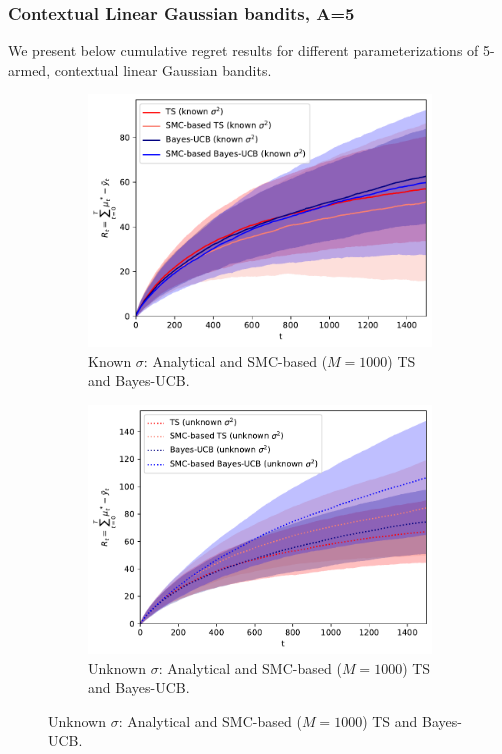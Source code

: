 \clearpage
\subsubsection{Contextual Linear Gaussian bandits, A=5}
\label{asssec:static_bandits_linearGaussian_5}

We present below cumulative regret results for different parameterizations of 5-armed, contextual linear Gaussian bandits.

\begin{figure}[!h]
	\centering
	\begin{subfigure}[b]{0.46\textwidth}
		\centering
		\includegraphics[width=\textwidth]{./fods_figs/static/linear_gaussian/A5/theta-0.2_-0.2_-0.1_-0.1_0._0._0.1_0.1_0.2_0.2_sigma0.5_0.5_0.5_0.5_0.5_M1000_cumulative_regret_knownsigma}
		\caption{Known $\sigma$: Analytical and SMC-based ($M=1000$) TS and Bayes-UCB.}
	\end{subfigure}
	\begin{subfigure}[b]{0.46\textwidth}
		\centering
		\includegraphics[width=\textwidth]{./fods_figs/static/linear_gaussian/A5/theta-0.2_-0.2_-0.1_-0.1_0._0._0.1_0.1_0.2_0.2_sigma0.5_0.5_0.5_0.5_0.5_M1000_cumulative_regret_unknownsigma}
		\caption{Unknown $\sigma$: Analytical and SMC-based ($M=1000$) TS and Bayes-UCB.}
	\end{subfigure}
	

\end{figure}
